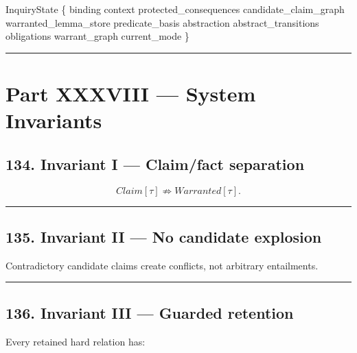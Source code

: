 \documentclass[
]{article}
\newenvironment{Shaded}{}{}
\newcommand{\NormalTok}[1]{#1}
\begin{document}
\begin{Shaded}
\begin{Highlighting}[]
\NormalTok{InquiryState \{}
\NormalTok{    binding}
\NormalTok{    context}
\NormalTok{    protected\_consequences}
\NormalTok{    candidate\_claim\_graph}
\NormalTok{    warranted\_lemma\_store}
\NormalTok{    predicate\_basis}
\NormalTok{    abstraction}
\NormalTok{    abstract\_transitions}
\NormalTok{    obligations}
\NormalTok{    warrant\_graph}
\NormalTok{    current\_mode}
\NormalTok{\}}
\end{Highlighting}
\end{Shaded}

\begin{center}\rule{0.5\linewidth}{0.5pt}\end{center}

\section{Part XXXVIII --- System
Invariants}\label{part-xxxviii-system-invariants}

\subsection{134. Invariant I --- Claim/fact
separation}\label{invariant-i-claimfact-separation}

\[
\boxed{
Claim[\tau]\not\Rightarrow Warranted[\tau].
}
\]

\begin{center}\rule{0.5\linewidth}{0.5pt}\end{center}

\subsection{135. Invariant II --- No candidate
explosion}\label{invariant-ii-no-candidate-explosion}

Contradictory candidate claims create conflicts, not arbitrary
entailments.

\begin{center}\rule{0.5\linewidth}{0.5pt}\end{center}

\subsection{136. Invariant III --- Guarded
retention}\label{invariant-iii-guarded-retention}

Every retained hard relation has:
\end{document}
